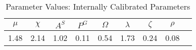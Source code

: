 \begin{table}[H] 
\singlespace 
\center 
\caption{Parameter Values: Internally Calibrated Parameters} \label{tab:mom}
\vspace{-.1in} 
\begin{tabular}{c c c c c c c c c}\hline 
\hline 
  	$\mu$ & $\chi$ & $A^S$ & $P^G$ & $\Omega$  & $\lambda$ & $\zeta$ &$\rho$  \\ 
\hline 
     1.48 &     2.14 &     1.02 &     0.11 &     0.54 &     1.73 &     0.24 &     0.08   \\  \hline 
\end{tabular}
\end{table} 
